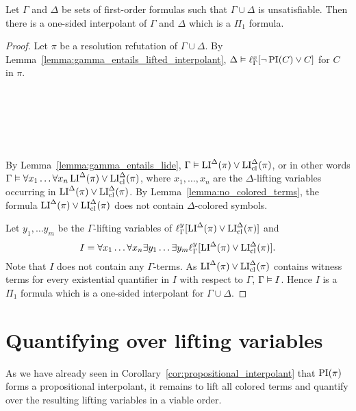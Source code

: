 \begin{prop}
	Let $\Gamma$ and $\Delta$ be sets of first-order formulas such that $\Gamma\cup\Delta$ is unsatisfiable.
	Then there is a one-sided interpolant of $\Gamma$ and $\Delta$ which is a $\Pi_1$ formula.
\end{prop}
\begin{proof}
	Let $\pi$ be a resolution refutation of $\Gamma\cup\Delta$.
	By Lemma~\ref{lemma:gamma_entails_lifted_interpolant},
	$\Delta \vDash \ell_{\Gamma}^{x}[ \lnot \operatorname{PI}(C) \lor C ]$ for $C$ in $\pi$.

	\mytodo{}

	~

	~

	~

	By Lemma~\ref{lemma:gamma_entails_lide}, $\Gamma \vDash \operatorname{LI}^\Delta(\pi) \lor \operatorname{LI}_{\operatorname{cl}}^\Delta(\pi)$,
	or in other words
	$\Gamma \vDash \forall x_1 \dots \forall x_n  \operatorname{LI}^\Delta(\pi) \lor \operatorname{LI}_{\operatorname{cl}}^\Delta(\pi)$, where $x_1, \dots, x_n$ are the $\Delta$-lifting variables occurring in $\operatorname{LI}^\Delta(\pi) \lor \operatorname{LI}_{\operatorname{cl}}^\Delta(\pi)$.
	By Lemma~\ref{lemma:no_colored_terms}, the formula $\operatorname{LI}^\Delta(\pi) \lor \operatorname{LI}_{\operatorname{cl}}^\Delta(\pi)$ does not contain $\Delta$-colored symbols.

	Let $y_1, \dots y_m$ be the $\Gamma$-lifting variables of $\ell_{\Gamma}^{y}[\operatorname{LI}^\Delta(\pi) \lor \operatorname{LI}_{\operatorname{cl}}^\Delta(\pi)]$
	and
	\[I = \forall x_1 \dots \forall x_n \exists y_1 \dots \exists y_m \ell_{\Gamma}^{y}[\operatorname{LI}^\Delta(\pi) \lor \operatorname{LI}_{\operatorname{cl}}^\Delta(\pi)].\]
	Note that $I$ does not contain any $\Gamma$-terms.
	As $\operatorname{LI}^\Delta(\pi) \lor \operatorname{LI}_{\operatorname{cl}}^\Delta(\pi)$ contains witness terms for every existential quantifier in $I$ with respect to $\Gamma$, $\Gamma \vDash I$.
	Hence $I$ is a $\Pi_1$ formula which is a one-sided interpolant for $\Gamma \cup \Delta$.
\end{proof}



\section{Quantifying over lifting variables}

As we have already seen in Corollary~\ref{cor:propositional_interpolant} that $\operatorname{PI}(\pi)$ forms a propositional interpolant, it remains to lift all colored terms and quantify over the resulting lifting variables in a viable order.


